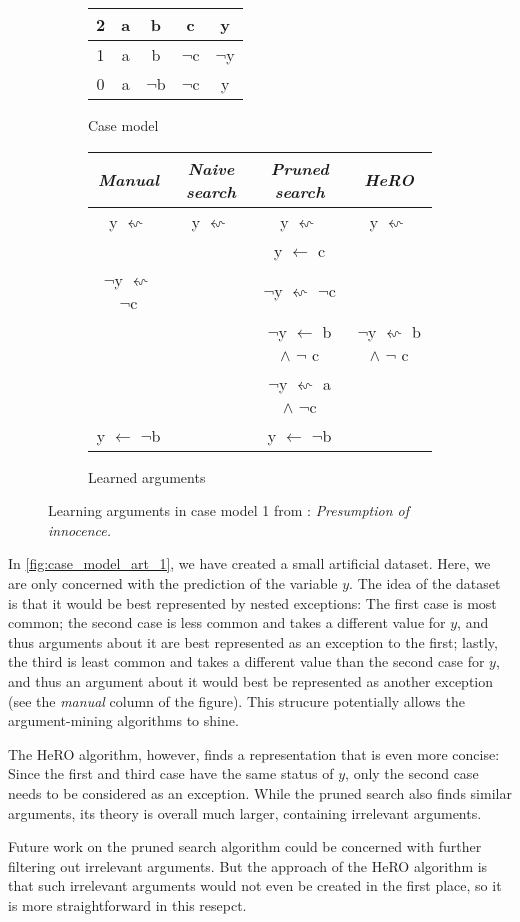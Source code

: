 \begin{figure}[h]
\centering
\begin{subfigure}{.25\textwidth}
  \centering
    \begin{tabular}{ c|c c c c } 
        2 & a & b & c & y \\ \hline
        1 & a & b & $\neg$c & $\neg$y \\ \hline
        0 & a & $\neg$b & $\neg$c & y \\
    \end{tabular}
  \caption{Case model}
\end{subfigure}%
\begin{subfigure}{.75\textwidth}
  \centering
    \begin{tabular}{ c|c|c|c } 
        \textit{Manual} & \textit{Naive search} & \textit{Pruned search} & \textit{HeRO} \\ \hline
        y $\leftsquigarrow$ & y $\leftsquigarrow$ & y $\leftsquigarrow$ & y $\leftsquigarrow$ \\
        & & y $\leftarrow$ c & \\
        $\neg$y $\leftsquigarrow$ $\neg$c & & $\neg$y $\leftsquigarrow$ $\neg$c & \\
        & & $\neg$y $\leftarrow$ b $\land$ $\neg$ c & $\neg$y $\leftsquigarrow$ b $\land$ $\neg$ c \\
        & & $\neg$y $\leftsquigarrow$ a $\land$ $\neg$c & \\ 
        y $\leftarrow$ $\neg$b & & y $\leftarrow$ $\neg$b & \\
    \end{tabular}
  \caption{Learned arguments}
\end{subfigure}
\caption{Learning arguments in case model 1 from \cite{verheijProofProbabilities2017}: \textit{Presumption of innocence.}}
\label{fig:case_model_art_1}
\end{figure}

In \autoref{fig:case_model_art_1}, we have created a small artificial dataset. Here, we are only concerned with the prediction of the variable $y$. The idea of the dataset is that it would be best represented by nested exceptions: The first case is most common; the second case is less common and takes a different value for $y$, and thus arguments about it are best represented as an exception to the first; lastly, the third is least common and takes a different value than the second case for $y$, and thus an argument about it would best be represented as another exception (see the \textit{manual} column of the figure). This strucure potentially allows the argument-mining algorithms to shine.

The HeRO algorithm, however, finds a representation that is even more concise: Since the first and third case have the same status of $y$, only the second case needs to be considered as an exception. While the pruned search also finds similar arguments, its theory is overall much larger, containing irrelevant arguments. 

Future work on the pruned search algorithm could be concerned with further filtering out irrelevant arguments. But the approach of the HeRO algorithm is that such irrelevant arguments would not even be created in the first place, so it is more straightforward in this resepct.